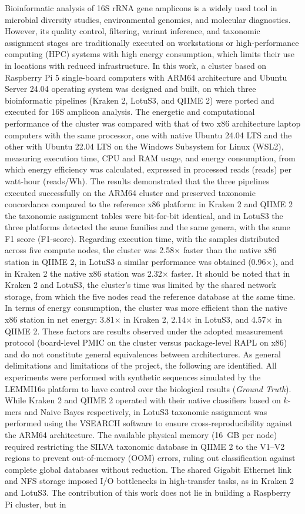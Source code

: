 \documentclass[12pt,oneside,spanish]{book}
\begin{document}
    Bioinformatic analysis of 16S rRNA gene amplicons is a widely used tool in microbial diversity studies, environmental genomics, and molecular diagnostics. However, its quality control, filtering, variant inference, and taxonomic assignment stages are traditionally executed on workstations or high-performance computing (HPC) systems with high energy consumption, which limits their use in locations with reduced infrastructure. In this work, a cluster based on Raspberry Pi 5 single-board computers with ARM64 architecture and Ubuntu Server 24.04 operating system was designed and built, on which three bioinformatic pipelines (Kraken 2, LotuS3, and QIIME 2) were ported and executed for 16S amplicon analysis. The energetic and computational performance of the cluster was compared with that of two x86 architecture laptop computers with the same processor, one with native Ubuntu 24.04 LTS and the other with Ubuntu 22.04 LTS on the Windows Subsystem for Linux (WSL2), measuring execution time, CPU and RAM usage, and energy consumption, from which energy efficiency was calculated, expressed in processed reads (reads) per watt-hour (reads/Wh). The results demonstrated that the three pipelines executed successfully on the ARM64 cluster and preserved taxonomic concordance compared to the reference x86 platform: in Kraken 2 and QIIME 2 the taxonomic assignment tables were bit-for-bit identical, and in LotuS3 the three platforms detected the same families and the same genera, with the same F1 score (F1-score). Regarding execution time, with the samples distributed across five compute nodes, the cluster was 2.58$\times$ faster than the native x86 station in QIIME 2, in LotuS3 a similar performance was obtained (0.96$\times$), and in Kraken 2 the native x86 station was 2.32$\times$ faster. It should be noted that in Kraken 2 and LotuS3, the cluster's time was limited by the shared network storage, from which the five nodes read the reference database at the same time. In terms of energy consumption, the cluster was more efficient than the native x86 station in net energy: 3.81$\times$ in Kraken 2, 2.14$\times$ in LotuS3, and 4.57$\times$ in QIIME 2. These factors are results observed under the adopted measurement protocol (board-level PMIC on the cluster versus package-level RAPL on x86) and do not constitute general equivalences between architectures. As general delimitations and limitations of the project, the following are identified. All experiments were performed with synthetic sequences simulated by the LEMMI16s platform to have control over the biological results (\textit{Ground Truth}). While Kraken 2 and QIIME 2 operated with their native classifiers based on $k$-mers and Naive Bayes respectively, in LotuS3 taxonomic assignment was performed using the VSEARCH software to ensure cross-reproducibility against the ARM64 architecture. The available physical memory (16~GB per node) required restricting the SILVA taxonomic database in QIIME 2 to the V1--V2 regions to prevent out-of-memory (OOM) errors, ruling out classification against complete global databases without reduction. The shared Gigabit Ethernet link and NFS storage imposed I/O bottlenecks in high-transfer tasks, as in Kraken 2 and LotuS3. The contribution of this work does not lie in building a Raspberry Pi cluster, but in 
\end{document}
